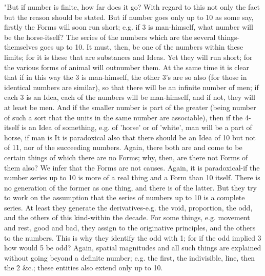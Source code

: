 "But if number is finite, how far does it go? With regard to this
not only the fact but the reason should be stated. But if number goes
only up to 10 as some say, firstly the Forms will soon run short;
e.g. if 3 is man-himself, what number will be the horse-itself? The
series of the numbers which are the several things-themselves goes
up to 10. It must, then, be one of the numbers within these limits;
for it is these that are substances and Ideas. Yet they will run short;
for the various forms of animal will outnumber them. At the same time
it is clear that if in this way the 3 is man-himself, the other 3's
are so also (for those in identical numbers are similar), so that
there will be an infinite number of men; if each 3 is an Idea, each
of the numbers will be man-himself, and if not, they will at least
be men. And if the smaller number is part of the greater (being number
of such a sort that the units in the same number are associable),
then if the 4-itself is an Idea of something, e.g. of 'horse' or of
'white', man will be a part of horse, if man is It is paradoxical
also that there should be an Idea of 10 but not of 11, nor of the
succeeding numbers. Again, there both are and come to be certain things
of which there are no Forms; why, then, are there not Forms of them
also? We infer that the Forms are not causes. Again, it is paradoxical-if
the number series up to 10 is more of a real thing and a Form than
10 itself. There is no generation of the former as one thing, and
there is of the latter. But they try to work on the assumption that
the series of numbers up to 10 is a complete series. At least they
generate the derivatives-e.g. the void, proportion, the odd, and the
others of this kind-within the decade. For some things, e.g. movement
and rest, good and bad, they assign to the originative principles,
and the others to the numbers. This is why they identify the odd with
1; for if the odd implied 3 how would 5 be odd? Again, spatial magnitudes
and all such things are explained without going beyond a definite
number; e.g. the first, the indivisible, line, then the 2 &c.; these
entities also extend only up to 10. 

